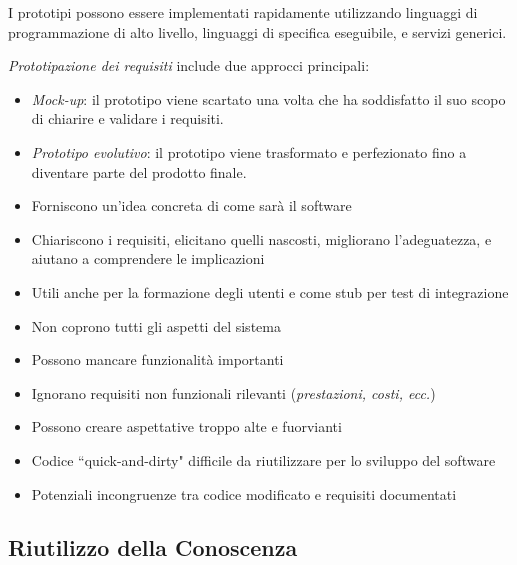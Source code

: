 I prototipi possono essere implementati rapidamente utilizzando linguaggi
di programmazione di alto livello, linguaggi di specifica eseguibile, e
servizi generici.

\textit{Prototipazione dei requisiti} include due approcci principali:
\begin{itemize}
    \item \textit{Mock-up}: il prototipo viene scartato una volta che ha
    soddisfatto il suo scopo di chiarire e validare i requisiti.
    \item \textit{Prototipo evolutivo}: il prototipo viene trasformato
    e perfezionato fino a diventare parte del prodotto finale.
\end{itemize}

\begin{tcolorbox}[colback=green!5!white,colframe=green!75!black, title=Pro
    dei prototipi e mock-up]
    \begin{itemize}
        \item Forniscono un'idea concreta di come sarà il software
        \item Chiariscono i requisiti, elicitano quelli nascosti, migliorano
        l'adeguatezza, e aiutano a comprendere le implicazioni
        \item Utili anche per la formazione degli utenti e come stub per test
        di integrazione
    \end{itemize}
\end{tcolorbox}

\begin{tcolorbox}[colback=red!5!white,colframe=red!75!black, title=Contro
    dei prototipi e mock-up]
    \begin{itemize}
        \item Non coprono tutti gli aspetti del sistema
        \item Possono mancare funzionalità importanti
        \item Ignorano requisiti non funzionali rilevanti
        (\textit{prestazioni, costi, ecc.})
        \item Possono creare aspettative troppo alte e fuorvianti
        \item Codice ``quick-and-dirty" difficile da riutilizzare per lo sviluppo
        del software
        \item Potenziali incongruenze tra codice modificato e requisiti documentati
    \end{itemize}
\end{tcolorbox}
\subsection{Riutilizzo della Conoscenza}

